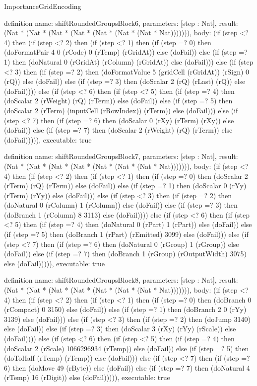 \begin{lexlean}{ImportanceGridEncoding}
\begin{semanticmodule}
definition{
  name: shiftRoundedGroupsBlock6,
  parameters: [step : Nat],
  result: (Nat * (Nat * (Nat * (Nat * (Nat * (Nat * (Nat * Nat))))))),
  body: (if (step <? 4) then
      (if (step <? 2) then
      (if (step <? 1) then
      (if (step =? 0) then (doFormatPair 4 0 (rCode) 0 (rTemp) (rGridAt)) else (doFail)) else
      (if (step =? 1) then (doNatural 0 (rGridAt) (rColumn) (rGridAt)) else (doFail))) else
      (if (step <? 3) then
      (if (step =? 2) then (doFormatValue 5 (gridCell (rGridAt)) (rSign) 0 (rQ)) else (doFail)) else
      (if (step =? 3) then (doScalar 2 (rQ) (rLast) (rQ)) else (doFail)))) else
      (if (step <? 6) then
      (if (step <? 5) then
      (if (step =? 4) then (doScalar 2 (rWeight) (rQ) (rTerm)) else (doFail)) else
      (if (step =? 5) then (doScalar 2 (rTerm) (inputCell (rRowIndex)) (rTerm)) else (doFail))) else
      (if (step <? 7) then
      (if (step =? 6) then (doScalar 0 (rXy) (rTerm) (rXy)) else (doFail)) else
      (if (step =? 7) then (doScalar 2 (rWeight) (rQ) (rTerm)) else (doFail))))),
  executable: true
}

definition{
  name: shiftRoundedGroupsBlock7,
  parameters: [step : Nat],
  result: (Nat * (Nat * (Nat * (Nat * (Nat * (Nat * (Nat * Nat))))))),
  body: (if (step <? 4) then
      (if (step <? 2) then
      (if (step <? 1) then
      (if (step =? 0) then (doScalar 2 (rTerm) (rQ) (rTerm)) else (doFail)) else
      (if (step =? 1) then (doScalar 0 (rYy) (rTerm) (rYy)) else (doFail))) else
      (if (step <? 3) then
      (if (step =? 2) then (doNatural 0 (rColumn) 1 (rColumn)) else (doFail)) else
      (if (step =? 3) then (doBranch 1 (rColumn) 8 3113) else (doFail)))) else
      (if (step <? 6) then
      (if (step <? 5) then
      (if (step =? 4) then (doNatural 0 (rPart) 1 (rPart)) else (doFail)) else
      (if (step =? 5) then (doBranch 1 (rPart) (rEmitted) 3099) else (doFail))) else
      (if (step <? 7) then
      (if (step =? 6) then (doNatural 0 (rGroup) 1 (rGroup)) else (doFail)) else
      (if (step =? 7) then (doBranch 1 (rGroup) (rOutputWidth) 3075) else (doFail))))),
  executable: true
}

definition{
  name: shiftRoundedGroupsBlock8,
  parameters: [step : Nat],
  result: (Nat * (Nat * (Nat * (Nat * (Nat * (Nat * (Nat * Nat))))))),
  body: (if (step <? 4) then
      (if (step <? 2) then
      (if (step <? 1) then
      (if (step =? 0) then (doBranch 0 (rCompact) 0 3150) else (doFail)) else
      (if (step =? 1) then (doBranch 2 0 (rYy) 3139) else (doFail))) else
      (if (step <? 3) then
      (if (step =? 2) then (doJump 3140) else (doFail)) else
      (if (step =? 3) then (doScalar 3 (rXy) (rYy) (rScale)) else (doFail)))) else
      (if (step <? 6) then
      (if (step <? 5) then
      (if (step =? 4) then (doScalar 2 (rScale) 1066296934 (rTemp)) else (doFail)) else
      (if (step =? 5) then (doToHalf (rTemp) (rTemp)) else (doFail))) else
      (if (step <? 7) then
      (if (step =? 6) then (doMove 49 (rByte)) else (doFail)) else
      (if (step =? 7) then (doNatural 4 (rTemp) 16 (rDigit)) else (doFail))))),
  executable: true
}


\end{semanticmodule}
\end{lexlean}
